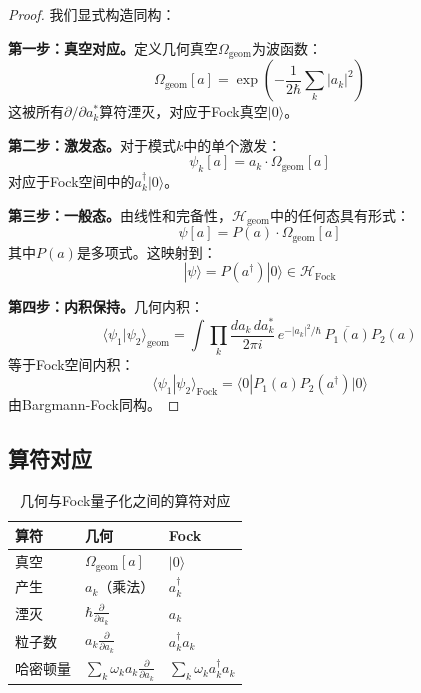 \begin{proof}
我们显式构造同构：

\textbf{第一步：真空对应。}定义几何真空$\Omega_{\text{geom}}$为波函数：
\begin{equation}
    \Omega_{\text{geom}}[a] = \exp\left(-\frac{1}{2\hbar} \sum_k |a_k|^2\right)
\end{equation}
这被所有$\partial/\partial a_k^*$算符湮灭，对应于Fock真空$|0\rangle$。

\textbf{第二步：激发态。}对于模式$k$中的单个激发：
\begin{equation}
    \psi_k[a] = a_k \cdot \Omega_{\text{geom}}[a]
\end{equation}
对应于Fock空间中的$a_k^\dagger |0\rangle$。

\textbf{第三步：一般态。}由线性和完备性，$\mathcal{H}_{\text{geom}}$中的任何态具有形式：
\begin{equation}
    \psi[a] = P(a) \cdot \Omega_{\text{geom}}[a]
\end{equation}
其中$P(a)$是多项式。这映射到：
\begin{equation}
    |\psi\rangle = P(a^\dagger) |0\rangle \in \mathcal{H}_{\text{Fock}}
\end{equation}

\textbf{第四步：内积保持。}几何内积：
\begin{equation}
    \langle \psi_1 | \psi_2 \rangle_{\text{geom}} = \int \prod_k \frac{da_k \, da_k^*}{2\pi i} \, e^{-|a_k|^2/\hbar} \, \overline{P_1(a)} P_2(a)
\end{equation}
等于Fock空间内积：
\begin{equation}
    \langle \psi_1 | \psi_2 \rangle_{\text{Fock}} = \langle 0 | P_1(a) P_2(a^\dagger) |0\rangle
\end{equation}
由Bargmann-Fock同构。
\end{proof}

\subsection{算符对应}

\begin{table}[h]
\centering
\caption{几何与Fock量子化之间的算符对应}
\begin{tabular}{|l|l|l|}
\hline
\textbf{算符} & \textbf{几何} & \textbf{Fock} \\
\hline
真空 & $\Omega_{\text{geom}}[a]$ & $|0\rangle$ \\
产生 & $a_k$（乘法） & $a_k^\dagger$ \\
湮灭 & $\hbar \frac{\partial}{\partial a_k}$ & $a_k$ \\
粒子数 & $a_k \frac{\partial}{\partial a_k}$ & $a_k^\dagger a_k$ \\
哈密顿量 & $\sum_k \omega_k a_k \frac{\partial}{\partial a_k}$ & $\sum_k \omega_k a_k^\dagger a_k$ \\
\hline
\end{tabular}
\end{table}

